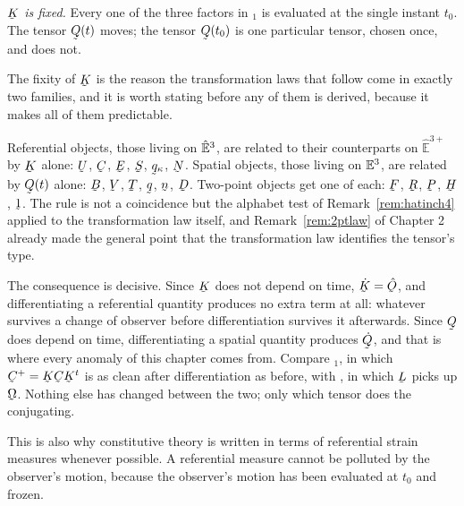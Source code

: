 \emph{$\bK$ is fixed.} Every one of the three factors in $_{1}$
is evaluated at the single instant $t_{0}$. The tensor $\bQ(t)$ moves;
the tensor $\bQ(t_{0})$ is one particular tensor, chosen once, and does
not.

\begin{remark}\label{rem:ch7Kfixed}
The fixity of $\bK$ is the reason the transformation laws that follow
come in exactly two families, and it is worth stating before any of them
is derived, because it makes all of them predictable.

Referential objects, those living on $\hat{\mathbb{E}}^{3}$, are related to their
counterparts on $\hat{\mathbb{E}}^{3+}$ by $\bK$ alone: $\bU$, $\bC$,
$\bE$, $\bS$, $\bq_{\kappa}$, $\bN$. Spatial objects, those living on
$\mathbb{E}^{3}$, are related by $\bQ(t)$ alone: $\bB$, $\bV$, $\bT$, $\bq$, $\bn$,
$\bD$. Two-point objects get one of each: $\bF$, $\bR$, $\bP$, $\bH$,
$\shift$. The rule is not a coincidence but the alphabet test of
Remark~\ref{rem:hatinch4} applied to the transformation law itself, and
Remark~\ref{rem:2ptlaw} of Chapter 2 already made the general point that
the transformation law identifies the tensor's type.

The consequence is decisive. Since $\bK$ does not depend on time,
$\dot\bK=\hOb$, and differentiating a referential quantity produces no
extra term at all: whatever survives a change of observer before
differentiation survives it afterwards. Since $\bQ$ does depend on time,
differentiating a spatial quantity produces $\dot\bQ$, and that is where
every anomaly of this chapter comes from. Compare $_{1}$, in
which $\bC^{+}=\bK\bC\bK^{t}$ is as clean after differentiation as
before, with , in which $\bL$ picks up $\bOm$. Nothing else has
changed between the two; only which tensor does the conjugating.

This is also why constitutive theory is written in terms of referential
strain measures whenever possible. A referential measure cannot be
polluted by the observer's motion, because the observer's motion has been
evaluated at $t_{0}$ and frozen.
\end{remark}

